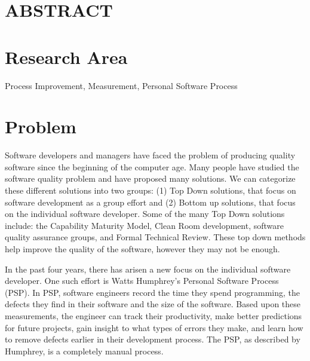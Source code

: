 \thispagestyle{empty}  %




\section*{ABSTRACT}

\section*{Research Area}
Process Improvement, Measurement, Personal Software Process
\section*{Problem}

Software developers and managers have faced the problem of producing
quality software since the beginning of the computer age.  Many people have
studied the software quality problem and have proposed many solutions.  We
can categorize these different solutions into two groups: (1) Top Down
solutions, that focus on software development as a group effort and (2)
Bottom up solutions, that focus on the individual software developer.  Some
of the many Top Down solutions include: the Capability Maturity Model,
Clean Room development, software quality assurance groups, and Formal
Technical Review.  These top down methods help improve the quality of the
software, however they may not be enough.

In the past four years, there has arisen a new focus on the individual
software developer.  One such effort is Watts Humphrey's Personal Software
Process (PSP)\cite{Humphrey95}.  In PSP, software engineers record the time
they spend programming, the defects they find in their software and the
size of the software.  Based upon these measurements, the engineer can
track their productivity, make better predictions for future projects, gain
insight to what types of errors they make, and learn how to remove defects
earlier in their development process.  The PSP, as described by Humphrey,
is a completely manual process.


